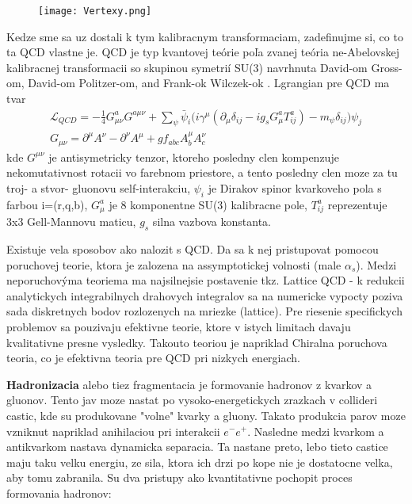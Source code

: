 \documentclass[../../main.tex]{subfiles}
\begin{document}
\begin{figure}[!h]
\centering
\texttt{[image: Vertexy.png]}
\caption{}
\label{sf1:ref:vertexy}
\end{figure}
\newline
Kedze sme sa uz dostali k tym kalibracnym transformaciam, zadefinujme si, co to ta QCD vlastne je. QCD je typ kvantovej teórie poľa zvanej teória ne-Abelovskej kalibracnej transformacii so skupinou symetrií SU(3) navrhnuta David-om Gross-om, David-om Politzer-om, and Frank-ok Wilczek-ok . Lgrangian pre 
QCD ma tvar
\begin{equation}
\begin{gathered}
\mathcal{L}_{QCD}=-\frac{1}{4}G^a_{\mu\nu}G^{a\mu\nu}+
\sum_{\psi}\bar{\psi}_i\big(i\gamma^{\mu}(\partial_{\mu}\delta_{ij}-ig_sG_{\mu}^aT_{ij}^a)-m_{\psi}\delta_{ij}\big)\psi_j\\
G_{\mu\nu}=\partial^{\mu}A^{\nu}-\partial^{\nu}A^{\mu}+gf_{abc}A^{\mu}_bA_c^{\nu}
\end{gathered}
\end{equation}
kde $G^{\mu\nu}$ je antisymetricky tenzor, ktoreho posledny clen kompenzuje nekomutativnost rotacii vo farebnom priestore, a tento posledny clen moze za tu troj- a stvor- gluonovu self-interakciu, $\psi_i$ je Dirakov spinor kvarkoveho pola s farbou i=(r,q,b), $G_{\mu}^a$ je 8 komponentne SU(3) kalibracne pole, $T_{ij}^a$ reprezentuje 3x3 Gell-Mannovu maticu, $g_s$ silna vazbova konstanta.\par
Existuje vela sposobov ako nalozit s QCD. Da sa k nej pristupovat pomocou poruchovej teorie, ktora je zalozena na assymptotickej volnosti (male $\alpha_s$). Medzi neporuchovýma teoriema ma najsilnejsie postavenie tkz. Lattice QCD - k redukcii analytickych integrabilnych drahovych integralov sa na numericke vypocty poziva sada diskretnych bodov rozlozenych na mriezke (lattice). Pre riesenie specifickych problemov sa pouzivaju efektivne teorie, ktore v istych limitach davaju kvalitativne presne vysledky. Takouto teoriou je napriklad Chiralna poruchova teoria, co je efektivna teoria pre QCD pri nizkych energiach.\par
\textbf{Hadronizacia} alebo tiez fragmentacia je formovanie hadronov z kvarkov a gluonov. Tento jav moze nastat po vysoko-energetickych zrazkach v collideri castic, kde su produkovane "volne" kvarky a gluony. Takato produkcia parov moze vzniknut napriklad anihilaciou pri interakcii $e^-e^+$. Nasledne medzi kvarkom a antikvarkom nastava dynamicka separacia. Ta nastane preto, lebo tieto castice maju taku velku energiu, ze sila, ktora ich drzi po kope nie je dostatocne velka, aby tomu zabranila. Su dva pristupy ako kvantitativne pochopit proces formovania hadronov: 
\end{document}
